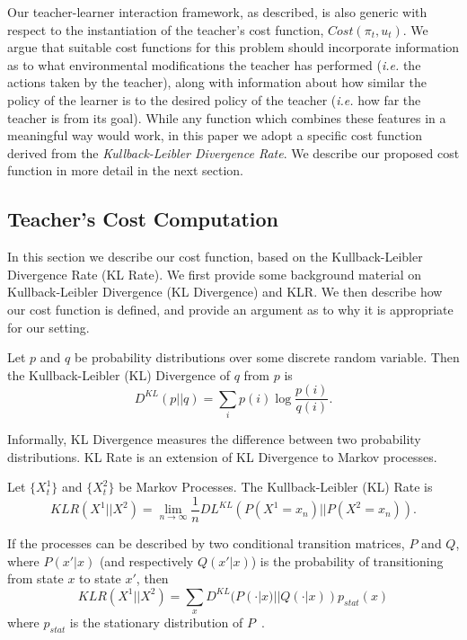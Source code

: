 Our teacher-learner interaction framework, as described, is also generic with respect to the 
instantiation of the teacher's cost function, $Cost(\pi_t,u_t)$. We argue that suitable cost functions 
for this problem should incorporate information as to what environmental modifications the teacher 
has performed (\emph{i.e.} the actions taken by the teacher), along with information about how 
similar the policy of the learner is to the desired policy of the teacher (\emph{i.e.} how far the 
teacher is from its goal). While any function which combines these features in a meaningful way 
would work, in this paper we adopt a specific cost function derived from the \emph{Kullback-Leibler 
Divergence Rate}.    We describe our proposed cost function in more detail in the next section.



\subsection{Teacher's Cost Computation}\label{sec:KLCost}

In this section we describe our cost function, based on the 
 Kullback-Leibler Divergence Rate (KL Rate).  We first provide some background material on 
 Kullback-Leibler Divergence (KL Divergence) and KLR. We then describe how our cost function is 
 defined, 
 and provide an argument as to why it is appropriate for our setting.


\begin{Definition}
Let $p$ and $q$ be probability distributions over some discrete random variable. Then the Kullback-Leibler (KL) Divergence of $q$ from $p$  is
\[
D^{KL}(p||q)=\sum_i p(i)\log \frac{p(i)}{q(i)}.
\]
\end{Definition}

\noindent Informally, KL Divergence measures the difference between two probability distributions.
KL Rate is an extension of KL Divergence to Markov processes.
\begin{Definition}
Let $\{X^1_t\}$ and $\{X^2_t\}$ be Markov Processes.  The Kullback-Leibler (KL) Rate is
\[
KLR(X^1||X^2)=\lim_{n\rightarrow \infty} \frac{1}{n}DL^{KL}(P(X^1=x_n)||P(X^2=x_n)).
\]
\end{Definition}
If the processes can be described by two conditional transition matrices, $P$ and $Q$, where $P(x'|x)$ (and  respectively $Q(x'|x)$) is the probability of transitioning from state $x$ to state $x'$, then
\[
KLR(X^1||X^2)=\sum_{x} D^{KL}(P(\cdot|x)||Q(\cdot|x))p_{stat}(x)
\]
where $p_{stat}$ is the stationary distribution of $P$~\cite{rached_alajaji_campbell_2004}.



